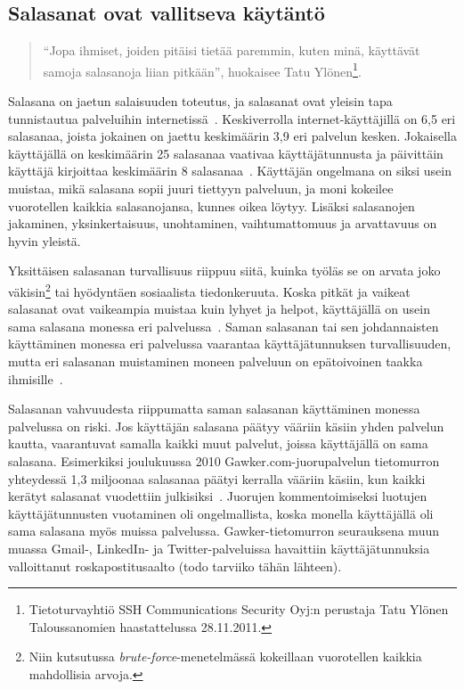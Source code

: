 \documentclass[finnish,gradu]{tktltiki}
\begin{document}
  \subsection{Salasanat ovat vallitseva käytäntö} %
  \label{sub:salasanat}

  \begin{quote}
    ``Jopa ihmiset, joiden pitäisi tietää paremmin, kuten minä, käyttävät samoja salasanoja liian pitkään'', huokaisee Tatu Ylönen\footnote{Tietoturvayhtiö SSH Communications Security Oyj:n perustaja Tatu Ylönen Taloussanomien haastattelussa 28.11.2011.}.
  \end{quote}

  Salasana on jaetun salaisuuden toteutus, ja salasanat ovat yleisin tapa tunnistautua palveluihin internetissä~\cite{study_of_passwords_07, passpet_06, password_management_strategies_06, pwdhash_extension_05}. Keskiverrolla internet-käyttäjillä on 6,5 eri salasanaa, joista jokainen on jaettu keskimäärin 3,9 eri palvelun kesken. Jokaisella käyttäjällä on keskimäärin 25 salasanaa vaativaa käyttäjätunnusta ja päivittäin käyttäjä kirjoittaa keskimäärin 8 salasanaa~\cite{study_of_passwords_07}. Käyttäjän ongelmana on siksi usein muistaa, mikä salasana sopii juuri tiettyyn palveluun, ja moni kokeilee vuorotellen kaikkia salasanojansa, kunnes oikea löytyy. Lisäksi salasanojen jakaminen, yksinkertaisuus, unohtaminen, vaihtumattomuus ja arvattavuus on hyvin yleistä.

  Yksittäisen salasanan turvallisuus riippuu siitä, kuinka työläs se on arvata joko väkisin\footnote{Niin kutsutussa \emph{brute-force}-menetelmässä kokeillaan vuorotellen kaikkia mahdollisia arvoja.} tai hyödyntäen sosiaalista tiedonkeruuta. Koska pitkät ja vaikeat salasanat ovat vaikeampia muistaa kuin lyhyet ja helpot, käyttäjällä on usein sama salasana monessa eri palvelussa~\cite{study_of_passwords_07}. Saman salasanan tai sen johdannaisten käyttäminen monessa eri palvelussa vaarantaa käyttäjätunnuksen turvallisuuden, mutta eri salasanan muistaminen moneen palveluun on epätoivoinen taakka ihmisille~\cite{password_management_strategies_06, passpet_06, pw_auth_system_perspective_08, users_are_not_the_enemy_99}.

  Salasanan vahvuudesta riippumatta saman salasanan käyttäminen monessa palvelussa on riski. Jos käyttäjän salasana päätyy vääriin käsiin yhden palvelun kautta, vaarantuvat samalla kaikki muut palvelut, joissa käyttäjällä on sama salasana. Esimerkiksi joulukuussa 2010 Gawker.com-juorupalvelun tietomurron yhteydessä 1,3 miljoonaa salasanaa päätyi kerralla vääriin käsiin, kun kaikki kerätyt salasanat vuodettiin julkisiksi~\cite{bbc_gawker_12_2010, forbes_gawker_12_2010}. Juorujen kommentoimiseksi luotujen käyttäjätunnusten vuotaminen oli ongelmallista, koska monella käyttäjällä oli sama salasana myös muissa palvelussa. Gawker-tietomurron seurauksena muun muassa Gmail-, LinkedIn- ja Twitter-palveluissa havaittiin käyttäjätunnuksia valloittanut roskapostitusaalto (todo tarviiko tähän lähteen).
\end{document}
